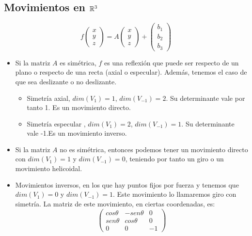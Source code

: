 

\subsection{Movimientos en $\mathbb{R}^3$}

\[
  f \begin{pmatrix}
    x\\
    y\\
    z
  \end{pmatrix} = A\begin{pmatrix}
    x\\
    y\\
    z
  \end{pmatrix} + \begin{pmatrix}
    b_1\\
    b_2\\
    b_3
  \end{pmatrix}
\]

\begin{itemize}
\item Si la matriz $A$ es simétrica, $f$ es una reflexión que puede ser respecto de un plano o respecto de una recta (axial o especular). Además, tenemos el caso de que sea deslizante o no deslizante.

  \begin{itemize}
  \item Simetría axial, $dim(V_1) = 1$, $dim(V_{-1}) =2$. Su determinante vale por tanto 1. Es un movimiento directo.
  \item Simetría especular , $dim(V_1) = 2$, $dim(V_{-1}) =1$. Su determinante vale -1.Es un movimiento inverso.
  \end{itemize}

\item Si la matriz $A$ no es simétrica, entonces podemos tener un movimiento directo con $dim(V_1) = 1$ y $dim(V_{-1})=0$, teniendo por tanto un giro o un movimiento helicoidal.

\item Movimientos inversos, en los que hay puntos fijos por fuerza y tenemos que $dim(V_1) = 0$ y $dim(V_{-1}) = 1$. Este movimiento lo llamaremos giro con simetría. La matriz de este movimiento, en ciertas coordenadas, es:
  \[
    \begin{pmatrix}
      cos \theta & -sen\theta  & 0\\
      sen\theta & cos\theta  & 0\\
      0 & 0 & -1
    \end{pmatrix}
  \]
\end{itemize}

